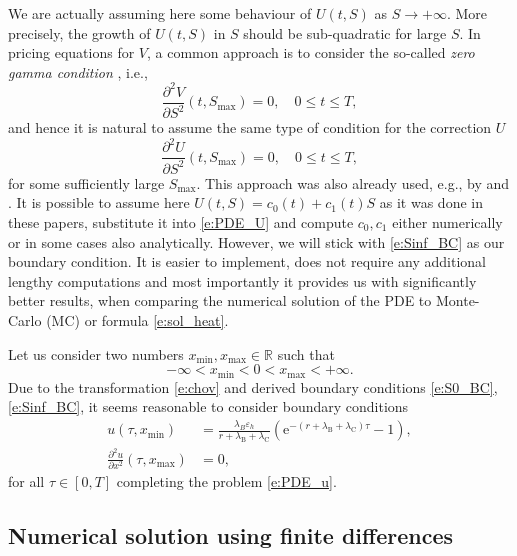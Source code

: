 \documentclass[a4paper,10pt]{article}
\newcommand{\e}{\mathrm{e}}
\newcommand{\1}{\mathbf{1}}
\begin{document}
We are actually assuming here some behaviour of $U(t,S)$ as $S\rightarrow +\infty$. More precisely, the growth of $U(t,S)$ in $S$ should be sub-quadratic for large $S$. In pricing equations for $V$, a common approach is to consider the so-called \emph{zero gamma condition} \cite[Sec. 2.3]{Hout17}, i.e.,
\[ \frac{\partial^{2} V}{\partial S^{2}}(t,S_{\max}) = 0,\quad 0\leq t\leq T, \]
and hence it is natural to assume the same type of condition for the correction $U$
\begin{equation}\label{e:Sinf_BC}
\frac{\partial^{2} U}{\partial S^{2}}(t,S_{\max}) = 0, \quad 0\leq t\leq T,
\end{equation}
for some sufficiently large $S_{\max}$. This approach was also already used, e.g., by \cite{Castillo13} and \cite{Arregui17}. It is possible to assume here $U(t,S) = c_{0}(t) + c_{1}(t) S$ as it was done in these papers, substitute it into \eqref{e:PDE_U} and compute $c_{0},c_{1}$ either numerically or in some cases also analytically. However, we will stick with \eqref{e:Sinf_BC} as our boundary condition. It is easier to implement, does not require any additional lengthy computations and most importantly it provides us with significantly better results, when comparing the numerical solution of the PDE to Monte-Carlo (MC) or formula \eqref{e:sol_heat}.

Let us consider two numbers $x_{\min}, x_{\max}\in\mathbb{R}$ such that
\begin{equation}
-\infty< x_{\min} < 0 < x_{\max} < +\infty.
\end{equation}
Due to the transformation \eqref{e:chov} and derived boundary conditions \eqref{e:S0_BC},\eqref{e:Sinf_BC}, it seems reasonable to consider boundary conditions
\begin{align}
u(\tau,x_{\min}) &= \frac{\lambda_{B}\varepsilon_{h}}{r+\lambda_{\text{B}}+\lambda_{\text{C}}}\left(\e^{-(r+\lambda_{\text{B}}+\lambda_{\text{C}})\tau}-1\right),\label{e:x_min_BC}\\
\frac{\partial^{2} u}{\partial x^{2}}(\tau,x_{\max}) &= 0,\label{e:x_max_BC}
\end{align}
for all $\tau\in [0,T]$ completing the problem \eqref{e:PDE_u}.


\subsection{Numerical solution using finite differences}\label{sec:meth_FD}
\end{document}

